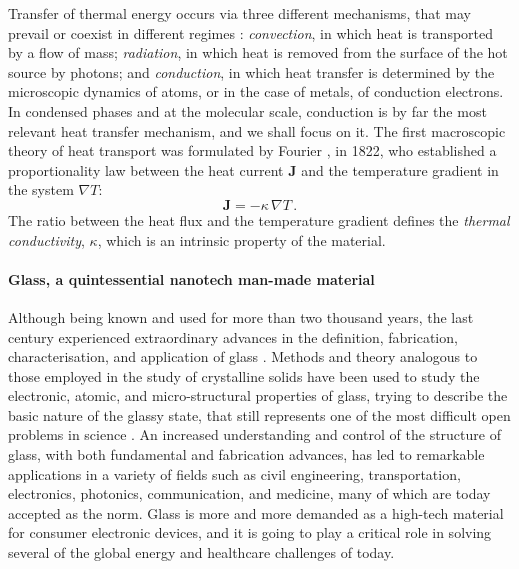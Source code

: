 Transfer of thermal energy occurs via three different mechanisms, that may prevail or coexist in different regimes \cite{Lienhard2017}: \emph{convection}, in which heat is transported by a flow of mass; \emph{radiation}, in which heat is removed from the surface of the hot source by photons; and \emph{conduction}, in which heat transfer is determined by the microscopic dynamics of atoms, or in the case of metals, of conduction electrons. 
In condensed phases and at the molecular scale, conduction is by far the most relevant heat transfer mechanism, and we shall focus on it. 
The first macroscopic theory of heat transport was formulated by Fourier \cite{Fourier1878}, in 1822, who established a proportionality law between the heat current $\mathbf{J}$ and the temperature gradient in the system $\nabla T$:
\begin{equation}
    \mathbf{J} = -\kappa\, \nabla T \,.  \label{eq:Fourier-law}
\end{equation}
The ratio between the heat flux and the temperature gradient defines the \emph{thermal conductivity}, $\kappa$, which is an intrinsic property of the material. 

\medskip

\paragraph{Glass, a quintessential nanotech man-made material}
Although being known and used for more than two thousand years, the last century experienced extraordinary advances in the definition, fabrication, characterisation, and application of glass \cite{Mauro2014}. 
Methods and theory analogous to those employed in the study of crystalline solids have been used to study the electronic, atomic, and micro-structural properties of glass, trying to describe the basic nature of the glassy state, that still represents one of the most difficult open problems in science \cite{MauroFM14}. 
An increased understanding and control of the structure of glass, with both fundamental and fabrication advances, has led to remarkable applications in a variety of fields such as civil engineering, transportation, electronics, photonics, communication, and medicine, many of which are today accepted as the norm. 
Glass is more and more demanded as a high-tech material for consumer electronic devices, and it is going to play a critical role in solving several of the global energy and healthcare challenges of today. 

